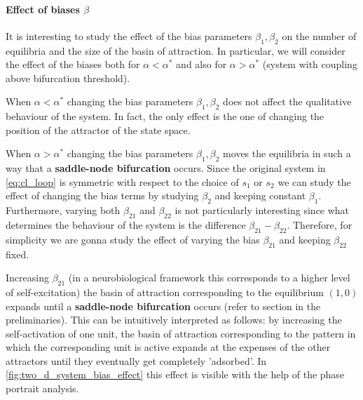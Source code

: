     
\paragraph{Effect of biases $\beta$} It is interesting to study the effect of the bias parameters $\beta_1,\beta_2 $ on the number of equilibria and the size of the basin of attraction. In particular, we will consider the effect of the biases both for $\alpha<\alpha^* $ and also for $\alpha>\alpha^* $ (system with coupling above bifurcation threshold). 

When $\alpha<\alpha^*$ changing the bias parameters $\beta_1, \beta_2$ does not affect the qualitative behaviour of the system. In fact, the only effect is the one of changing the position of the attractor of the state space.

When $\alpha>\alpha^*$ changing the bias parameters $\beta_1, \beta_2$ moves the equilibria in such a way that a \textbf{saddle-node bifurcation} occurs.
Since the original system in \eqref{eq:cl_loop} is symmetric with respect to the choice of $s_1$ or $s_2$ we can study the effect of changing the bias terms by studying $\beta_2$ and keeping constant $\beta_1$. Furthermore, varying both $\beta_{21}$ and $\beta_{22}$ is not particularly interesting since what determines the behaviour of the system is the difference  $\beta_{21} - \beta_{22}$. Therefore, for simplicity we are gonna study the effect of varying the bias $\beta_{21}$ and keeping $\beta_{22}$ fixed. 

Increasing $\beta_{21}$ (in a neurobiological framework this corresponds to a higher level of self-excitation) the basin of attraction corresponding to the equilibrium $(1, 0)$ expands until a \textbf{saddle-node bifurcation} occurs (refer to section in the preliminaries). This can be intuitively interpreted as follows: by increasing the self-activation of one unit, the basin of attraction corresponding to the pattern in which the corresponding unit is active expands at the expenses of the other attractors until they eventually get completely 'adsorbed'. In \cref{fig:two_d_system_bias_effect} this effect is visible with the help of the phase portrait analysis.

